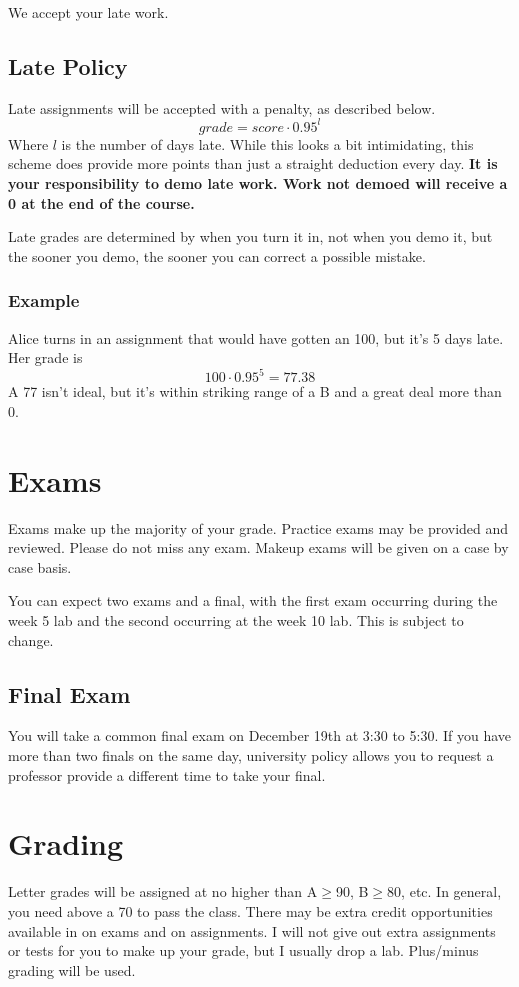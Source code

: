 \documentclass[10pt, letter]{article}
\begin{document}
We accept your late work. 



\subsection*{Late Policy}
Late assignments will be accepted with a penalty, as described below.  $$grade = score \cdot 0.95^{l}$$
Where $l$ is the number of days late.  While this looks a bit intimidating, this scheme does provide more points than just a straight deduction every day. \textbf{It is your responsibility to demo late work.  Work not demoed will receive a 0 at the end of the course.}

Late grades are determined by when you turn it in, not when you demo it, but the sooner you demo, the sooner you can correct a possible mistake. 

\subsubsection*{Example}
Alice turns in an assignment that would have gotten an 100, but it's 5 days late.  Her grade is $$100\cdot 0.95^{5} = 77.38$$ A 77 isn't ideal, but it's within striking range of a B and a great deal more than 0.

\section{Exams}
Exams make up the majority of your grade.
Practice exams may be provided and reviewed.  
Please do not miss any exam.  
Makeup exams will be given on a case by case basis.


You can expect two exams and a final, with the first exam occurring during the week 5 lab and the second occurring at the week 10 lab.
This is subject to change.


\subsection{{Final Exam}}
You will take a common final exam on December 19th at 3:30 to 5:30.  
If you have more than two finals on the same day, university policy allows you to request a professor provide a different time to take your final.


\section{Grading}

Letter grades will be assigned at no higher than A$\geq$90, B$\geq$80, etc.
In general, you need above a 70 to pass the class.
There may be extra credit opportunities available in on exams and on assignments.
I will not give out extra assignments or tests for you to make up your grade, but I usually drop a lab.
Plus/minus grading will be used.
\end{document}
